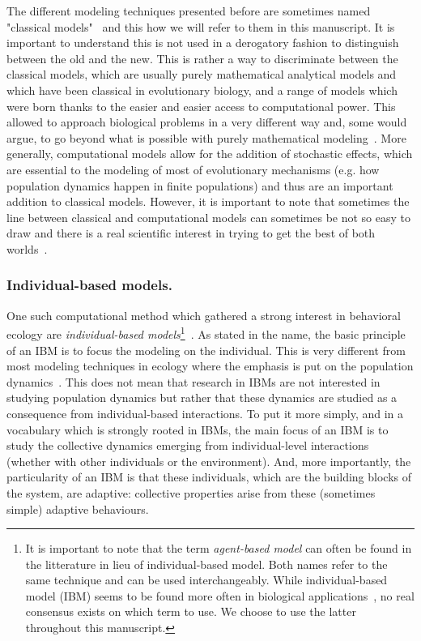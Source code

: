     The different modeling techniques presented before are sometimes named "classical models"~\parencite{DeAngelis2005, Adami2014} and this how we will refer to them in this manuscript. It is important to understand this is not used in a derogatory fashion to distinguish between the old and the new. This is rather a way to discriminate between the classical models, which are usually purely mathematical analytical models and which have been classical in evolutionary biology, and a range of models which were born thanks to the easier and easier access to computational power. This allowed to approach biological problems in a very different way and, some would argue, to go beyond what is possible with purely mathematical modeling~\parencite{Adami2012}. More generally, computational models allow for the addition of stochastic effects, which are essential to the modeling of most of evolutionary mechanisms (e.g. how population dynamics happen in finite populations) and thus are an important addition to classical models. However, it is important to note that sometimes the line between classical and computational models can sometimes be not so easy to draw and there is a real scientific interest in trying to get the best of both worlds~\parencite{Wilson1998}.

    \subsubsection{Individual-based models.} One such computational method which gathered a strong interest in behavioral ecology are \emph{individual-based models}\footnote{It is important to note that the term \emph{agent-based model} can often be found in the litterature in lieu of individual-based model. Both names refer to the same technique and can be used interchangeably. While individual-based model (IBM) seems to be found more often in biological applications~\parencite{Grimm2005}, no real consensus exists on which term to use. We choose to use the latter throughout this manuscript.}~\parencite{Huston1988}. As stated in the name, the basic principle of an IBM is to focus the modeling on the individual. This is very different from most modeling techniques in ecology where the emphasis is put on the population dynamics~\parencite{Grimm2005}. This does not mean that research in IBMs are not interested in studying population dynamics but rather that these dynamics are studied as a consequence from individual-based interactions. To put it more simply, and in a vocabulary which is strongly rooted in IBMs, the main focus of an IBM is to study the collective dynamics emerging from individual-level interactions (whether with other individuals or the environment). And, more importantly, the particularity of an IBM is that these individuals, which are the building blocks of the system, are adaptive: collective properties arise from these (sometimes simple) adaptive behaviours.

